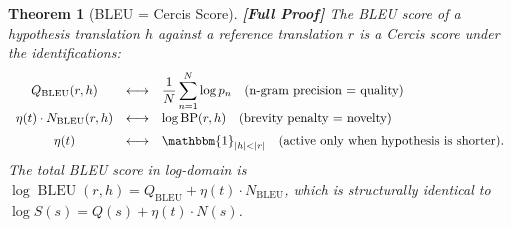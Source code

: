 \documentclass[12pt,a4paper]{article}
\newtheorem{theorem}{Theorem}[section]
\theoremstyle{remark}
\newcommand{\Cercis}{\textsf{Cercis}}
\DeclareMathOperator{\BLEU}{BLEU}
\newcommand{\rigorFull}{\textbf{[Full Proof]}}
\begin{document}
\begin{theorem}[BLEU = Cercis Score]
\label{thm:bleu_cercis}
\rigorFull
The BLEU score of a hypothesis translation $h$ against a reference
translation $r$ is a \Cercis{} score under the identifications:
\begin{equation}
  \label{eq:bleu_cercis_map}
  \begin{array}{ccl}
    Q_{\text{BLEU}}(r, h) &\longleftrightarrow& \displaystyle \frac{1}{N}\sum_{n=1}^N \log p_n \quad \text{(n-gram precision = quality)} \\[10pt]
    \eta(t) \cdot N_{\text{BLEU}}(r, h) &\longleftrightarrow& \log\text{BP}(r, h) \quad \text{(brevity penalty = novelty)} \\[6pt]
    \eta(t) &\longleftrightarrow& \mathbbm{1}_{|h| < |r|} \quad \text{(active only when hypothesis is shorter)}.
  \end{array}
\end{equation}
The total BLEU score in log-domain is $\log\BLEU(r, h) = Q_{\text{BLEU}} + \eta(t) \cdot N_{\text{BLEU}}$, which is structurally identical to
$\log S(s) = Q(s) + \eta(t) \cdot N(s)$.
\end{theorem}
\end{document}
